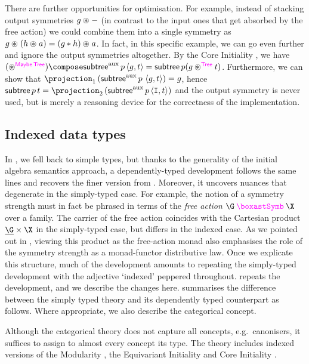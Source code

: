 There are further opportunities for optimisation. For example, instead
of stacking output symmetries $g \act -$ (in contrast to the input
ones that get absorbed by the free action) we could combine them into
a single symmetry as $g \act (h \act a) = (g \mul h) \act a$. In fact,
in this specific example, we can go even further and ignore the output
symmetries altogether. By the Core Initiality
, we
have $(\act[\Maybe\Tree])
\compose \subtreeAux\,p\pair gt = \subtree\,p(g \act[\Tree]t)$.
Furthermore, we can show that
$\projection_1\parent{\subtreeAux\,p\,\pair gt} = g$, hence
$\subtree\,p\,t = \projection_2\parent{\subtreeAux\,p\pair \stet t}$
and the output symmetry is never used, but is merely a reasoning
device for the correctness of the implementation.

\subsection{Indexed data types}

In , we fell back to simple types,
but thanks to the generality of the initial algebra semantics
approach, a dependently-typed development follows the same lines and
recovers the finer version from .
Moreover, it uncovers nuances that degenerate in the simply-typed case. For
example, the notion of a symmetry strength must in fact be phrased in
terms of the \emph{free action} $\gast \X$ over a family. The carrier
of the free action
coincides with the Cartesian product $\carrier\G \times \X$ in the
simply-typed case, but differs in the indexed case.
As we pointed out in ,
viewing this product as
the free-action monad also emphasises the role of the symmetry strength
as a monad-functor distributive law.
Once we explicate
this structure, much of the development amounts to repeating the
simply-typed development with the adjective `indexed' peppered
throughout.  repeats the development, and we
describe the changes here. 
summarises the difference between the simply typed theory and its
dependently typed counterpart as follows. Where appropriate, we also
describe the categorical concept.


Although the categorical theory does not capture all
concepts, e.g.~canonisers, it suffices to assign to almost every concept its
type. The theory includes indexed versions of the Modularity
, the Equivariant Initiality
 and Core Initiality
.

